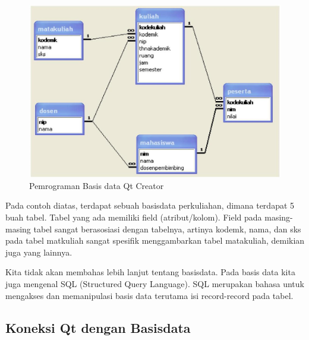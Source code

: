 \begin{figure}
\centering
\includegraphics[width=0.7\linewidth]{images/basis-data-qt}
\caption{Pemrograman Basis data Qt Creator}
\label{fig:basis-data-qt}
\end{figure}


Pada contoh diatas, terdapat sebuah basisdata perkuliahan, dimana
terdapat 5 buah tabel. Tabel yang ada memiliki field (atribut/kolom).
Field pada masing-masing tabel sangat berasosiasi dengan tabelnya,
artinya kodemk, nama, dan sks pada tabel matkuliah sangat spesifik
menggambarkan tabel matakuliah, demikian juga yang lainnya.

Kita tidak akan membahas lebih lanjut tentang basisdata. Pada basis data
kita juga mengenal SQL (Structured Query Language). SQL merupakan bahasa
untuk mengakses dan memanipulasi basis data terutama isi record-record
pada tabel.

\subsection{Koneksi Qt dengan Basisdata}\label{koneksi-qt-dengan-basisdata}

